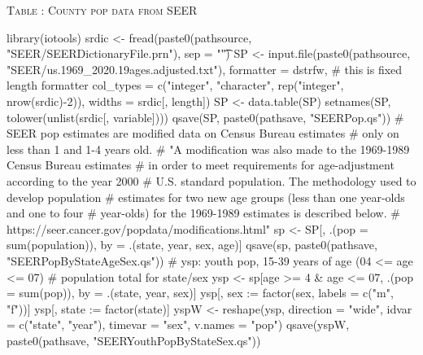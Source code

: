 \begin{appendix}
\clearpage
\textsc{Table \thetable: County pop data from SEER}
\begin{Schunk}
\begin{Sinput}
library(iotools)
srdic <- fread(paste0(pathsource, "SEER/SEERDictionaryFile.prn"), sep = "\t")
SP <- input.file(paste0(pathsource, "SEER/us.1969_2020.19ages.adjusted.txt"), 
  formatter = dstrfw, # this is fixed length formatter
  col_types = c("integer", "character", rep("integer", nrow(srdic)-2)), 
  widths = srdic[, length])
SP <- data.table(SP)
setnames(SP, tolower(unlist(srdic[, variable])))
qsave(SP, paste0(pathsave, "SEERPop.qs"))
# SEER pop estimates are modified data on Census Bureau estimates 
# only on less than 1 and 1-4 years old.
# "A modification was also made to the 1969-1989 Census Bureau estimates 
# in order to meet requirements for age-adjustment according to the year 2000 
# U.S. standard population. The methodology used to develop population 
# estimates for two new age groups (less than one year-olds and one to four 
# year-olds) for the 1969-1989 estimates is described below. 
# https://seer.cancer.gov/popdata/modifications.html"
sp <- SP[, .(pop = sum(population)), by = .(state, year, sex, age)]
qsave(sp, paste0(pathsave, "SEERPopByStateAgeSex.qs"))
# ysp: youth pop, 15-39 years of age (04 <= age <= 07) 
# population total for state/sex
ysp <- sp[age >= 4 & age <= 07, .(pop = sum(pop)), by = .(state, year, sex)]
ysp[, sex := factor(sex, labels = c("m", "f"))]
ysp[, state := factor(state)]
yspW <- reshape(ysp, direction = "wide", idvar = c("state", "year"), 
  timevar = "sex", v.names = "pop")
qsave(yspW, paste0(pathsave, "SEERYouthPopByStateSex.qs"))
\end{Sinput}
\end{Schunk}


\end{appendix}
